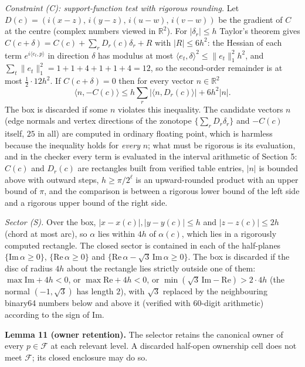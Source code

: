 \documentclass[
  11pt,
]{article}
\begin{document}
\emph{Constraint (C): support-function test with rigorous rounding.} Let
\(D(c)=(i(x-z),\,i(y-z),\,i(u-w),\,i(v-w))\) be the gradient of \(C\) at
the centre (complex numbers viewed in \(\mathbb R^2\)). For
\(|\delta_r|\le h\) Taylor's theorem gives
\(C(c+\delta)=C(c)+\sum_rD_r(c)\delta_r+R\) with \(|R|\le6h^2\): the
Hessian of each term \(e^{i\langle e_t,p\rangle}\) in direction
\(\delta\) has modulus at most
\(\langle e_t,\delta\rangle^2\le\|e_t\|_1^2h^2\), and
\(\sum_t\|e_t\|_1^2=1+1+4+1+1+4=12\), so the second-order remainder is
at most \(\tfrac12\cdot12h^2\). If \(C(c+\delta)=0\) then for every
vector \(n\in\mathbb R^2\) \[
\langle n,-C(c)\rangle\le h\sum_r|\langle n,D_r(c)\rangle|+6h^2|n| .
\] The box is discarded if some \(n\) violates this inequality. The
candidate vectors \(n\) (edge normals and vertex directions of the
zonotope \(\{\sum_rD_r\delta_r\}\) and \(-C(c)\) itself, \(25\) in all)
are computed in ordinary floating point, which is harmless because the
inequality holds for \emph{every} \(n\); what must be rigorous is its
evaluation, and in the checker every term is evaluated in the interval
arithmetic of Section 5: \(C(c)\) and \(D_r(c)\) are rectangles built
from verified table entries, \(|n|\) is bounded above with outward
steps, \(h\ge\pi/2^\ell\) is an upward-rounded product with an upper
bound of \(\pi\), and the comparison is between a rigorous lower bound
of the left side and a rigorous upper bound of the right side.

\emph{Sector (S).} Over the box, \(|x-x(c)|,|y-y(c)|\le h\) and
\(|z-z(c)|\le2h\) (chord at most arc), so \(\alpha\) lies within \(4h\)
of \(\alpha(c)\), which lies in a rigorously computed rectangle. The
closed sector is contained in each of the half-planes
\(\{\mathrm{Im}\,\alpha\ge0\}\), \(\{\mathrm{Re}\,\alpha\ge0\}\) and
\(\{\mathrm{Re}\,\alpha-\sqrt3\,\mathrm{Im}\,\alpha\ge0\}\). The box is
discarded if the disc of radius \(4h\) about the rectangle lies strictly
outside one of them: \(\max\mathrm{Im}+4h<0\), or
\(\max\mathrm{Re}+4h<0\), or
\(\min(\sqrt3\,\mathrm{Im}-\mathrm{Re})>2\cdot4h\) (the normal
\((-1,\sqrt3)\) has length \(2\)), with \(\sqrt3\) replaced by the
neighbouring binary64 numbers below and above it (verified with 60-digit
arithmetic) according to the sign of \(\mathrm{Im}\).

\textbf{Lemma 11 (owner retention).} The selector retains the canonical
owner of every \(p\in\mathcal F\) at each relevant level. A discarded
half-open ownership cell does not meet \(\mathcal F\); its closed
enclosure may do so.
\end{document}
